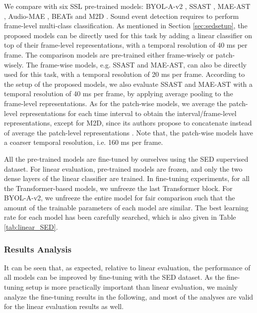 We compare with six SSL pre-trained models: BYOL-A-v2 \cite{niizumi_byol_2023}, SSAST \cite{gong_ssast_2022}, MAE-AST \cite{baade_mae-ast_2022}, Audio-MAE \cite{huang_masked_2023}, BEATs \cite{chen_beats_2022} and M2D \cite{niizumi_masked_2023}. 
Sound event detection requires to perform frame-level multi-class classification. As mentioned in Section \ref{sec:sedsetup}, the proposed models can be directly used for this task by adding a linear classifier on top of their frame-level representations, with a temporal resolution of 40 ms per frame. The comparison models are pre-trained either frame-wisely or patch-wisely. The frame-wise models, e.g. SSAST and MAE-AST, can also be directly used for this task, with a temporal resolution of 20 ms per frame. According to the setup of the proposed models, we also evaluate SSAST and MAE-AST with a temporal resolution of 40 ms per frame, by applying average pooling to the frame-level representations.  
As for the patch-wise models, we average the patch-level representations for each time interval to obtain the interval/frame-level representations, except for M2D, since its authors propose to concatenate instead of average the patch-level representations \cite{niizumi_masked_2023}. 
Note that, the patch-wise models have a coarser temporal resolution, i.e. 160 ms per frame.



All the pre-trained models are fine-tuned by ourselves using the SED supervised dataset. For linear evaluation, pre-trained models are frozen, and only the two dense layers of the linear classifier are trained. In fine-tuning experiments, for all the Transformer-based models, we unfreeze the last Transformer block. For BYOL-A-v2, we unfreeze the entire model for fair comparison such that the amount of the trainable parameters of each model are similar. The best learning rate for each model has been carefully searched, which is also given in Table \ref{tab:linear_SED}.

\subsubsection{Results Analysis}

 It can be seen that, as expected, relative to linear evaluation, the performance of all models can be improved by fine-tuning with the SED dataset. As the fine-tuning setup is more practically important than linear evaluation, we mainly analyze the fine-tuning results in the following, and most of the analyses are valid for the linear evaluation results as well. 

